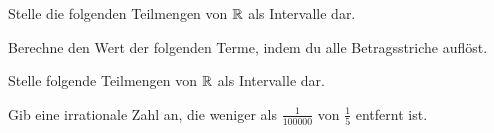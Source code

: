 \documentclass[11pt]{exam}
\begin{document}
\begin{questions}

\noaddpoints
\question[\totalpoints]
\addpoints
Stelle die folgenden Teilmengen von $\mathbb{R}$ als Intervalle dar.


\noaddpoints
\question[\totalpoints]
\addpoints
Berechne den Wert der folgenden Terme, indem du alle Betragsstriche auflöst.


\noaddpoints
\question[\totalpoints]
\addpoints
Stelle folgende Teilmengen von $\mathbb{R}$ als Intervalle dar.


\question[2]
Gib eine irrationale Zahl an, die weniger als $\frac{1}{100000}$ von $\frac{1}{5}$ entfernt ist.


\end{questions}
\end{document}

